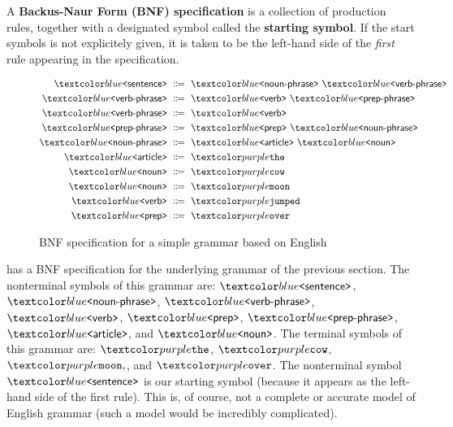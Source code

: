 \begin{definition}
A \textbf{Backus-Naur Form (BNF) specification} is a collection of production rules, together with a designated symbol called the \textbf{starting symbol}.
If the start symbols is not explicitely given, it is taken to be the left-hand side of the \textit{first} rule appearing in the specification.
\end{definition}

\begin{figure}
\begin{align*}
\bnfnt{sentence} &\bnfeq \bnfnt{noun-phrase} \ \bnfnt{verb-phrase} \\
\bnfnt{verb-phrase} &\bnfeq \bnfnt{verb} \ \bnfnt{prep-phrase} \\
\bnfnt{verb-phrase} &\bnfeq \bnfnt{verb} \\
\bnfnt{prep-phrase} &\bnfeq \bnfnt{prep} \ \bnfnt{noun-phrase} \\
\bnfnt{noun-phrase} &\bnfeq \bnfnt{article} \ \bnfnt{noun} \\
\bnfnt{article} &\bnfeq \bnft{the} \\
\bnfnt{noun} &\bnfeq \bnft{cow} \\
\bnfnt{noun} &\bnfeq \bnft{moon} \\
\bnfnt{verb} &\bnfeq \bnft{jumped} \\
\bnfnt{prep} &\bnfeq \bnft{over}
\end{align*}
\caption{BNF specification for a simple grammar based on English}
\label{fig:simple-grammar}
\end{figure}

\begin{example}
   has a BNF specification for the underlying grammar of the previous section.
  The nonterminal symbols of this grammar are: $\bnfnt{sentence}$, $\bnfnt{noun-phrase}$, $\bnfnt{verb-phrase}$, $\bnfnt{verb}$, $\bnfnt{prep}$, $\bnfnt{prep-phrase}$, $\bnfnt{article}$, and $\bnfnt{noun}$.
  The terminal symbols of this grammar are: $\bnft{the}$, $\bnft{cow}$, $\bnft{moon}, $, and $\bnft{over}$.
  The nonterminal symbol $\bnfnt{sentence}$ is our starting symbol (because it appears as the left-hand side of the first rule).
  This is, of course, not a complete or accurate model of English grammar (such a model would be incredibly complicated).
\end{example}


